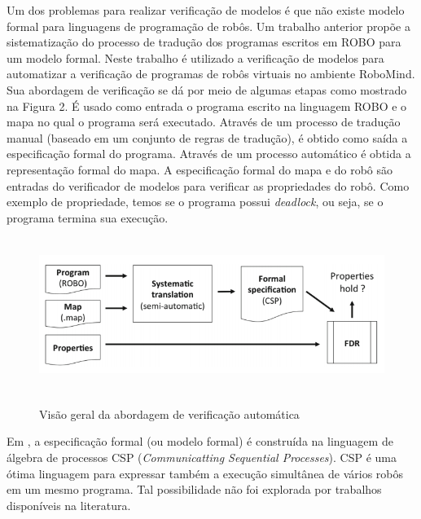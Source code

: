 Um dos problemas para realizar verificação de modelos é que não existe modelo formal para linguagens de programação de robôs. Um trabalho anterior \cite{nogueira} propõe a sistematização do processo de tradução dos programas escritos em ROBO para um modelo formal.  Neste trabalho é utilizado a verificação de modelos para automatizar a verificação de programas de robôs virtuais no ambiente RoboMind. Sua abordagem de verificação se dá por meio de algumas etapas como mostrado na Figura 2. É usado como entrada o programa escrito na linguagem ROBO e o mapa no qual o programa será executado. Através de um processo de tradução manual (baseado em um conjunto de regras de tradução), é obtido como saída a especificação formal do programa. Através de um processo automático é obtida a representação formal do mapa. A especificação formal do mapa e do robô são entradas do verificador de modelos para verificar as propriedades do robô. Como exemplo de propriedade, temos se o programa possui \textit{deadlock}, ou seja, se o programa termina sua execução. 

\begin{figure}[h]
\centering
\caption{Visão geral da abordagem de verificação automática}
\includegraphics[height=5cm]{figuras/approach_workflow.png}
\label{fig:fluxograma}
\end{figure} 

Em \cite{nogueira}, a especificação formal (ou modelo formal) é construída na linguagem de álgebra de processos CSP (\textit{Communicatting Sequential Processes}). CSP é uma ótima linguagem para expressar também a execução simultânea de vários robôs em um mesmo programa. Tal possibilidade não foi explorada por trabalhos disponíveis na literatura.

